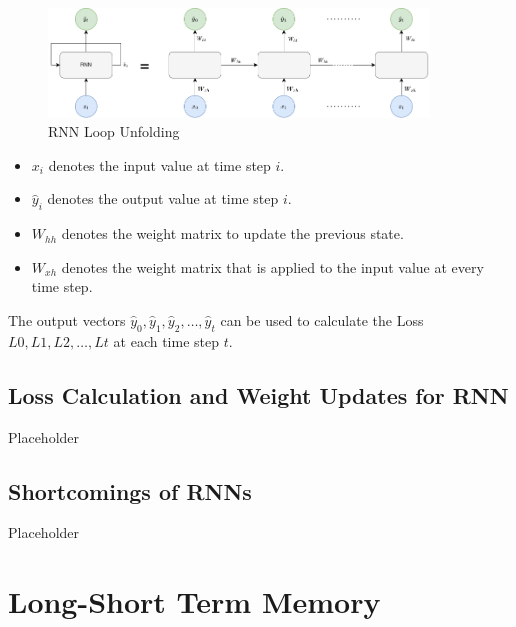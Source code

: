             \begin{figure}[h!]
                \centering
                \includegraphics[width=0.90\textwidth]{figures/rnn_loop_unfolding.drawio.png}
                \caption{RNN Loop Unfolding}
                \label{fig:rnn-loop-unfolding}
            \end{figure}
            \begin{itemize}
                \item $x_i$ denotes the input value at time step $i$.
                \item $\hat{y}_i$ denotes the output value at time step $i$.
                \item $W_{hh}$ denotes the weight matrix to update the previous state.
                \item $W_{xh}$ denotes the weight matrix that is applied to the input value at every time step.
            \end{itemize}
            The output vectors $\hat{y}_0, \hat{y}_1, \hat{y}_2, \dots, \hat{y}_t$ can be used to calculate the Loss $L0, L1, L2, \dots, Lt$ at each time step $t$.

        \subsection{Loss Calculation and Weight Updates for RNN}
        \label{sec:loss-calculation-and-weight-updates-for-rnn-background}

            Placeholder

        \subsection{Shortcomings of RNNs}
        \label{sec:shortcomings-of-rnns-background}
            
            Placeholder

    \section{Long-Short Term Memory}
    \label{sec:lstm-background}

